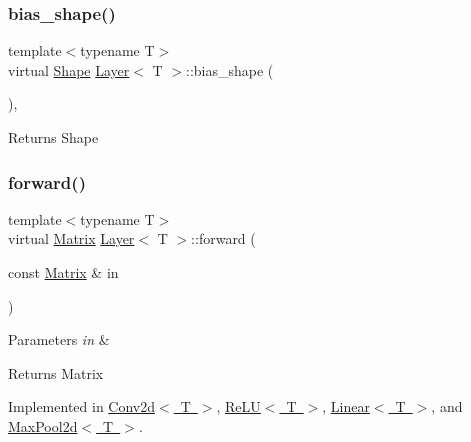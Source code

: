 \mbox{\label{class_layer_ad557254136784e9312ebb197b2bd3faf}} 
\subsubsection{\texorpdfstring{bias\_shape()}{bias\_shape()}}
{\footnotesize\ttfamily template$<$typename T$>$ \\
virtual \mbox{\hyperlink{class_layer_a8313f42d2292d12dd5d40cc115636693}{Shape}} \mbox{\hyperlink{class_layer}{Layer}}$<$ T $>$\+::bias\+\_\+shape (\begin{DoxyParamCaption}{ }\end{DoxyParamCaption})\hspace{0.3cm}{\ttfamily [inline]}, {\ttfamily [virtual]}}

\begin{DoxyReturn}{Returns}
Shape 
\end{DoxyReturn}
\mbox{\label{class_layer_ab15b665c86974b1cf1d7ba4e309cb0e5}} 
\subsubsection{\texorpdfstring{forward()}{forward()}}
{\footnotesize\ttfamily template$<$typename T$>$ \\
virtual \mbox{\hyperlink{class_layer_a22b1e7286096aa62bd245536c8ebdaf1}{Matrix}} \mbox{\hyperlink{class_layer}{Layer}}$<$ T $>$\+::forward (\begin{DoxyParamCaption}\item[{const \mbox{\hyperlink{class_layer_a22b1e7286096aa62bd245536c8ebdaf1}{Matrix}} \&}]{in }\end{DoxyParamCaption})\hspace{0.3cm}{\ttfamily [pure virtual]}}


\begin{DoxyParams}{Parameters}
{\em in} & \\
\hline
\end{DoxyParams}
\begin{DoxyReturn}{Returns}
Matrix 
\end{DoxyReturn}


Implemented in \mbox{\hyperlink{class_conv2d_ab795f6a1cabcfedfb2fcb55c9389c2fe}{Conv2d$<$ T $>$}}, \mbox{\hyperlink{class_re_l_u_aef903f5e7d309e76f49abc34043354ce}{Re\+L\+U$<$ T $>$}}, \mbox{\hyperlink{class_linear_a901668e9219a8d446b2ac60718b9c9f1}{Linear$<$ T $>$}}, and \mbox{\hyperlink{class_max_pool2d_a424de7878c64a058a8549362dae448f0}{Max\+Pool2d$<$ T $>$}}.

